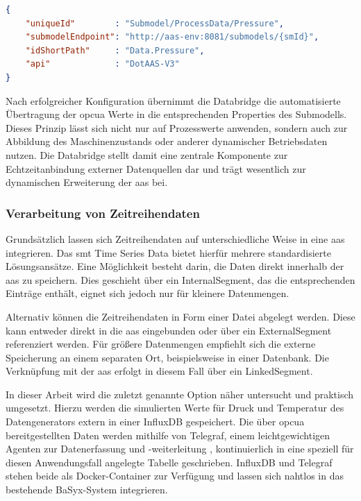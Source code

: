 \newpage
\begin{lstlisting}[language=json, caption={\acs{json}-Konfiguration einer Datensenke}, label={lst:jsonDatensenke}]
{
    "uniqueId"        : "Submodel/ProcessData/Pressure",
    "submodelEndpoint": "http://aas-env:8081/submodels/{smId}",
    "idShortPath"     : "Data.Pressure",
    "api"             : "DotAAS-V3"
}
\end{lstlisting}

Nach erfolgreicher Konfiguration übernimmt die Databridge die automatisierte Übertragung der \acs{opcua} Werte in die entsprechenden Properties des Submodells.
Dieses Prinzip lässt sich nicht nur auf Prozesswerte anwenden, sondern auch zur Abbildung des Maschinenzustands oder anderer dynamischer Betriebsdaten nutzen.
Die Databridge stellt damit eine zentrale Komponente zur Echtzeitanbindung externer Datenquellen dar und trägt wesentlich zur dynamischen Erweiterung der \acs{aas} bei.

\subsubsection{Verarbeitung von Zeitreihendaten}
\label{sec: VerarbeitungZeitreihen}
Grundsätzlich lassen sich Zeitreihendaten auf unterschiedliche Weise in eine \acs{aas} integrieren.
Das \acs{smt} Time Series Data \cite{SpezifikationTimeSeriesData} bietet hierfür mehrere standardisierte Lösungsansätze.
Eine Möglichkeit besteht darin, die Daten direkt innerhalb der \acs{aas} zu speichern. 
Dies geschieht über ein InternalSegment, das die entsprechenden Einträge enthält, eignet sich jedoch nur für kleinere Datenmengen.

Alternativ können die Zeitreihendaten in Form einer Datei abgelegt werden. 
Diese kann entweder direkt in die \acs{aas} eingebunden oder über ein ExternalSegment referenziert werden.
Für größere Datenmengen empfiehlt sich die externe Speicherung an einem separaten Ort, beispielsweise in einer Datenbank.
Die Verknüpfung mit der \acs{aas} erfolgt in diesem Fall über ein LinkedSegment.

In dieser Arbeit wird die zuletzt genannte Option näher untersucht und praktisch umgesetzt.
Hierzu werden die simulierten Werte für Druck und Temperatur des Datengenerators extern in einer InfluxDB gespeichert.
Die über \acs{opcua} bereitgestellten Daten werden mithilfe von Telegraf, einem leichtgewichtigen Agenten zur Datenerfassung und -weiterleitung \cite{Influx}, kontinuierlich in eine speziell für diesen Anwendungsfall angelegte Tabelle geschrieben.
InfluxDB und Telegraf stehen beide als Docker-Container zur Verfügung und lassen sich nahtlos in das bestehende BaSyx-System integrieren.

